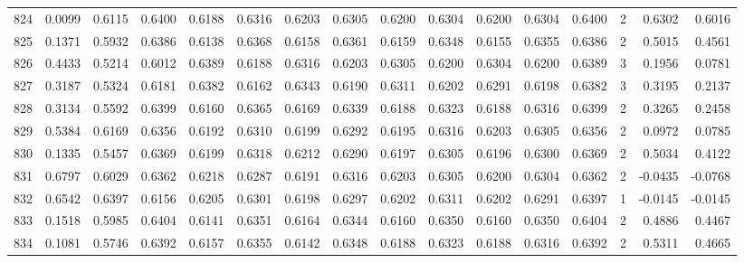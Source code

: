 \begin{tabular}{lrrrrrrrrrrrrrrr}
824 &      0.0099 &  0.6115 &  0.6400 &  0.6188 &  0.6316 &  0.6203 &  0.6305 &  0.6200 &  0.6304 &  0.6200 &   0.6304 &     0.6400 &      2 &                    0.6302 &                     0.6016 \\
825 &      0.1371 &  0.5932 &  0.6386 &  0.6138 &  0.6368 &  0.6158 &  0.6361 &  0.6159 &  0.6348 &  0.6155 &   0.6355 &     0.6386 &      2 &                    0.5015 &                     0.4561 \\
826 &      0.4433 &  0.5214 &  0.6012 &  0.6389 &  0.6188 &  0.6316 &  0.6203 &  0.6305 &  0.6200 &  0.6304 &   0.6200 &     0.6389 &      3 &                    0.1956 &                     0.0781 \\
827 &      0.3187 &  0.5324 &  0.6181 &  0.6382 &  0.6162 &  0.6343 &  0.6190 &  0.6311 &  0.6202 &  0.6291 &   0.6198 &     0.6382 &      3 &                    0.3195 &                     0.2137 \\
828 &      0.3134 &  0.5592 &  0.6399 &  0.6160 &  0.6365 &  0.6169 &  0.6339 &  0.6188 &  0.6323 &  0.6188 &   0.6316 &     0.6399 &      2 &                    0.3265 &                     0.2458 \\
829 &      0.5384 &  0.6169 &  0.6356 &  0.6192 &  0.6310 &  0.6199 &  0.6292 &  0.6195 &  0.6316 &  0.6203 &   0.6305 &     0.6356 &      2 &                    0.0972 &                     0.0785 \\
830 &      0.1335 &  0.5457 &  0.6369 &  0.6199 &  0.6318 &  0.6212 &  0.6290 &  0.6197 &  0.6305 &  0.6196 &   0.6300 &     0.6369 &      2 &                    0.5034 &                     0.4122 \\
831 &      0.6797 &  0.6029 &  0.6362 &  0.6218 &  0.6287 &  0.6191 &  0.6316 &  0.6203 &  0.6305 &  0.6200 &   0.6304 &     0.6362 &      2 &                   -0.0435 &                    -0.0768 \\
832 &      0.6542 &  0.6397 &  0.6156 &  0.6205 &  0.6301 &  0.6198 &  0.6297 &  0.6202 &  0.6311 &  0.6202 &   0.6291 &     0.6397 &      1 &                   -0.0145 &                    -0.0145 \\
833 &      0.1518 &  0.5985 &  0.6404 &  0.6141 &  0.6351 &  0.6164 &  0.6344 &  0.6160 &  0.6350 &  0.6160 &   0.6350 &     0.6404 &      2 &                    0.4886 &                     0.4467 \\
834 &      0.1081 &  0.5746 &  0.6392 &  0.6157 &  0.6355 &  0.6142 &  0.6348 &  0.6188 &  0.6323 &  0.6188 &   0.6316 &     0.6392 &      2 &                    0.5311 &                     0.4665 \\

\end{tabular}
